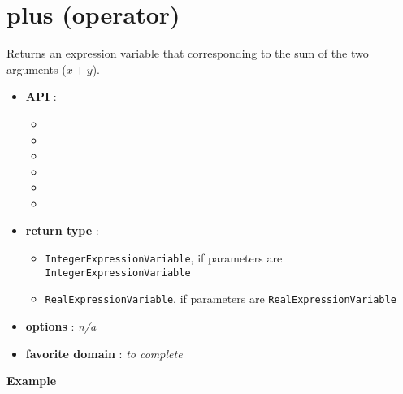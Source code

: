 \label{plus}
\hypertarget{plus}{}



\section{plus (operator)}\label{plus:plusoperator}\hypertarget{plus:plusoperator}{}
Returns an expression variable that corresponding to the sum of the two arguments (\(x+y\)).

\begin{itemize}
	\item \textbf{API} :
	\begin{itemize}
		\item {}
		\item {}
		\item {}
		\item {}
		\item {}
		\item {}
	\end{itemize}
	\item \textbf{return type} :
	\begin{itemize}
		\item \texttt{IntegerExpressionVariable}, if parameters are \texttt{IntegerExpressionVariable}
		\item \texttt{RealExpressionVariable}, if parameters are \texttt{RealExpressionVariable}
	\end{itemize}
	\item \textbf{options} : \emph{n/a}
	\item \textbf{favorite domain} : \emph{to complete}
\end{itemize}

\textbf{Example}



